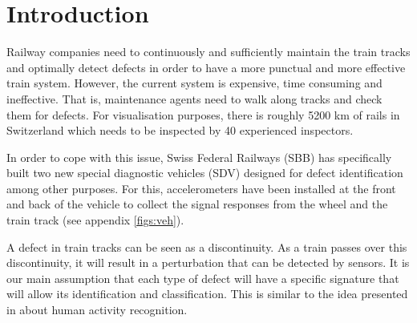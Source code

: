 



%



\maketitle

%
{
  \hypersetup{linkcolor=black}
  \tableofcontents
   
}
\newpage
\chapter{Introduction}
Railway companies need to continuously and sufficiently maintain the train tracks and optimally detect defects in order to have a more punctual and more effective train system. However, the current system is expensive, time consuming and ineffective. That is, maintenance agents need to walk along tracks and check them for defects. For visualisation purposes, there is roughly 5200 km of rails in Switzerland which needs to be inspected by 40 experienced inspectors.


In order to cope with this issue, Swiss Federal Railways (SBB) has specifically built two new special diagnostic vehicles (SDV) designed for defect identification among other purposes. For this, accelerometers have been installed at the front and back of the vehicle to collect the signal responses from the wheel and the train track (see appendix \ref{figs:veh}).

A defect in train tracks can be seen as a discontinuity. As a train passes over this discontinuity, it will result in a perturbation that can be detected by sensors. It is our main assumption that each type of defect will have a specific signature that will allow its identification and classification. This is similar to the idea presented in \cite{Introduc31:online} about human activity recognition.

